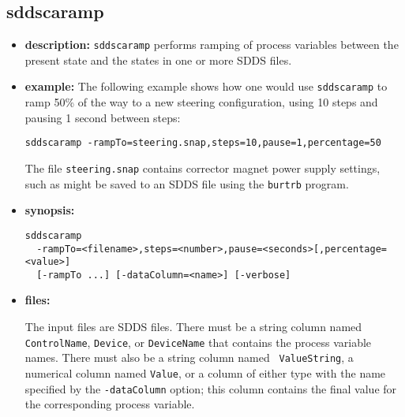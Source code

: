 %
%
\begin{latexonly}
\newpage
\end{latexonly}

%
%
\subsection{sddscaramp}
\label{sddscaramp}

\begin{itemize}
\item {\bf description:}
%
%
\verb+sddscaramp+ performs ramping of process variables between
the present state and the states in one or more SDDS files.

\item {\bf example:} 
%
% 
%
The following example shows how one would use \verb+sddscaramp+ to
ramp 50\% of the way to a new steering configuration, using 10
steps and pausing 1 second between steps: 
\begin{verbatim}
sddscaramp -rampTo=steering.snap,steps=10,pause=1,percentage=50
\end{verbatim}
The file \verb+steering.snap+ contains corrector magnet power supply
settings, such as might be saved to an SDDS file using the 
\verb+burtrb+ program.
\item {\bf synopsis:} 
%
%
\begin{verbatim}
sddscaramp 
  -rampTo=<filename>,steps=<number>,pause=<seconds>[,percentage=<value>]
  [-rampTo ...] [-dataColumn=<name>] [-verbose]
\end{verbatim}
\item {\bf files:}

The input files are SDDS files.  There must be a string column named
{\tt ControlName}, {\tt Device}, or {\tt DeviceName} that contains the
process variable names.  There must also be a string column named {\tt
ValueString}, a numerical column named {\tt Value}, or a column of
either type with the name specified by the \verb+-dataColumn+ option;
this column contains the final value for the corresponding process
variable.  


\end{itemize}
